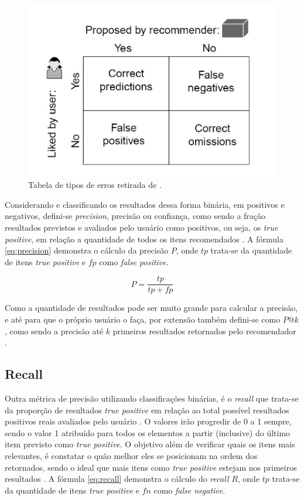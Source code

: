 \begin{figure}
	\centering
	\includegraphics[scale=0.4]{imagens/truth_table.jpg}
	\caption{Tabela de tipos de erros retirada de \cite{Jannach:2010}.}
	\label{fig:truth_table}
\end{figure}

Considerando e classificando os resultados dessa forma binária, em positivos e negativos, defini-se \textit{precision}, precisão ou confiança, como sendo a fração resultados previstos e avaliados pelo usuário como positivos, ou seja, os \textit{true positive}, em relação a quantidade de todos os itens recomendados \citep{Powers_2008}. A fórmula \ref{eq:precision} demonstra o cálculo da precisão $P$, onde $tp$ trata-se da quantidade de itens \textit{true positive} e $fp$ como \textit{false positive}.

\begin{equation}
	P = \frac{tp}{tp + fp}
\label{eq:precision}
\end{equation}

Como a quantidade de resultados pode ser muito grande para calcular a precisão, e até para que o próprio usuário o faça, por extensão também defini-se como $P@k$, como sendo a precisão até $k$ primeiros resultados retornados pelo recomendador \citep{Aggarwal2016:Evaluation}.

\subsection{Recall}

Outra métrica de precisão utilizando classificações binárias, é o \textit{recall} que trata-se da proporção de resultados \textit{true positive} em relação ao total possível resultados positivos reais avaliados pelo usuário \citep{Powers_2008}. O valores irão progredir de 0 a 1 sempre, sendo o valor 1 atribuído para todos os elementos a partir (inclusive) do último item previsto como \textit{true positive}. O objetivo além de verificar quais os itens mais relevantes, é constatar o quão melhor eles se posicionam na ordem dos retornados, sendo o ideal que mais itens como \textit{true positive} estejam nos primeiros resultados \citep{Jannach:2010}. A fórmula \ref{eq:recall} demonstra o cálculo do \textit{recall} $R$, onde $tp$ trata-se da quantidade de itens \textit{true positive} e $fn$ como \textit{false negative}.

